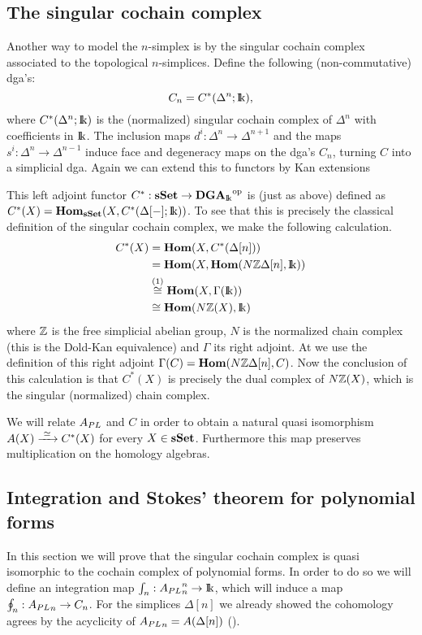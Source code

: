 \subsection{The singular cochain complex}

Another way to model the $n$-simplex is by the singular cochain complex associated to the topological $n$-simplices. Define the following (non-commutative) dga's:
$$ C_n = C^\ast(\Delta^n; \mathrm{I\!k}), $$
where $C^\ast(\Delta^n; \mathrm{I\!k})$ is the (normalized) singular cochain complex of $\Delta^n$ with coefficients in $\mathrm{I\!k}$. The inclusion maps $d^i : \Delta^n \to \Delta^{n+1}$ and the maps $s^i: \Delta^n \to \Delta^{n-1}$ induce face and degeneracy maps on the dga's $C_n$, turning $C$ into a simplicial dga. Again we can extend this to functors by Kan extensions

This left adjoint functor $C^\ast : \mathbf{s{\mathbf{Set}}} \to {\mathbf{DGA}_{\mathrm{I\!k}}}^{\text{op}}$ is (just as above) defined as $C^\ast(X) = \mathbf{Hom}_{\mathbf{s{\mathbf{Set}}}}(X, C^\ast(\Delta[-]; \mathrm{I\!k}))$. To see that this is precisely the classical definition of the singular \linebreak cochain complex, we make the following calculation.
\begin{align*}
	C^\ast(X) &= \mathbf{Hom}(X, C^\ast(\Delta[n])) \\
	          &= \mathbf{Hom}(X, \mathbf{Hom}(N \mathbb{Z} \Delta[n], \mathrm{I\!k})) \\
	          &\stackrel{(1)}{\cong} \mathbf{Hom}(X, \Gamma(\mathrm{I\!k})) \\
	          &\cong \mathbf{Hom}(N \mathbb{Z} (X), \mathrm{I\!k})
\end{align*}
where $\mathbb{Z}$ is the free simplicial abelian group, $N$ is the normalized chain complex (this is the Dold-Kan equivalence) and $\Gamma$ its right adjoint. At  we use the definition of this right adjoint $\Gamma(C) = \mathbf{Hom}(N \mathbb{Z} \Delta[n], C)$. Now the conclusion of this calculation is that $C^\ast(X)$ is precisely the dual complex of $N \mathbb{Z} (X)$, which is the singular (normalized) chain complex.

We will relate ${A_{PL}}$ and $C$ in order to obtain a natural quasi isomorphism $A(X) \xrightarrow{\,\,{\simeq}\,\,} C^\ast(X)$ for every $X \in \mathbf{s{\mathbf{Set}}}$. Furthermore this map preserves multiplication on the homology algebras.


\subsection{Integration and Stokes' theorem for polynomial forms}

In this section we will prove that the singular cochain complex is quasi isomorphic to the cochain complex of polynomial forms. In order to do so we will define an integration map $\int_n : {A_{PL}}_n^n \to \mathrm{I\!k}$, which will induce a map $\oint_n : {A_{PL}}_n \to C_n$. For the simplices $\Delta[n]$ we already showed the cohomology agrees by the acyclicity of ${A_{PL}}_n = A(\Delta[n])$ ().

